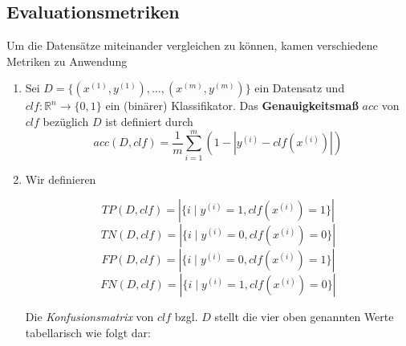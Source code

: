 \subsection{Evaluationsmetriken}
Um die Datensätze miteinander vergleichen zu können, kamen verschiedene Metriken zu Anwendung
\begin{enumerate}
    \item
          Sei $D = \{(x^{(1)}, y^{(1)}), \dots, (x^{(m)}, y^{(m)})\}$ ein Datensatz und $clf: \mathbb{R}^n \to \{0, 1\}$ ein (binärer) Klassifikator. Das \textbf{Genauigkeitsmaß} $acc$ von $clf$ bezüglich $D$ ist definiert durch
          \begin{equation}
              acc(D, clf) = \frac{1}{m} \sum_{i=1}^{m} \left(1 - \left|y^{(i)} - clf(x^{(i)})\right|\right)
          \end{equation}

    \item
          Wir definieren

          \begin{equation}
              TP(D, clf) = |\{i \mid y^{(i)} = 1, clf(x^{(i)}) = 1\}|
          \end{equation}
          \begin{equation}
              TN(D, clf) = |\{i \mid y^{(i)} = 0, clf(x^{(i)}) = 0\}|
          \end{equation}
          \begin{equation}
              FP(D, clf) = |\{i \mid y^{(i)} = 0, clf(x^{(i)}) = 1\}|
          \end{equation}
          \begin{equation}
              FN(D, clf) = |\{i \mid y^{(i)} = 1, clf(x^{(i)}) = 0\}|
          \end{equation}

          Die \textit{Konfusionsmatrix} von $clf$ bzgl. $D$ stellt die vier oben genannten Werte tabellarisch wie folgt dar:


\end{enumerate}
